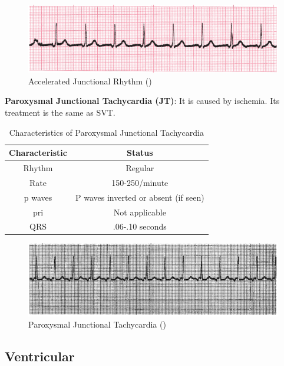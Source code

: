  \begin{figure}[H]
\centering
\includegraphics[scale=0.8]{img/AJR.png}
\caption{Accelerated Junctional Rhythm (\cite{arryth_types})}
\label{fig:AJR}
\end{figure}

\textbf{Paroxysmal Junctional Tachycardia (JT)}: It is caused by ischemia. Its treatment is the same as SVT.

\begin{table}[H]
\begin{center}
\begin{tabular}{||c || c||}
 \hline
\textbf{Characteristic} & \textbf{Status} \\ [0.4ex] 
 \hline\hline
 Rhythm & Regular \\
\hline
Rate & 150-250/minute \\
\hline
p waves & P waves inverted or absent (if seen) \\
\hline
pri & Not applicable \\
\hline
QRS & .06-.10 seconds \\
\hline\hline
\end{tabular}
\end{center}
\caption{Characteristics of Paroxysmal Junctional Tachycardia}
\label{table:JT_characteristics}
\end{table}

 \begin{figure}[H]
\centering
\includegraphics[scale=0.8]{img/JT.png}
\caption{Paroxysmal Junctional Tachycardia (\cite{arryth_types})}
\label{fig:JT}
\end{figure}


\subsection{Ventricular}


